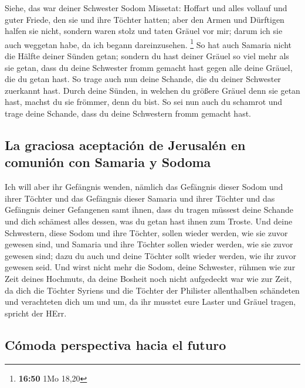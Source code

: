  Siehe, das war deiner Schwester Sodom Missetat: Hoffart
und alles vollauf und guter Friede, den sie und ihre Töchter hatten;
aber den Armen und Dürftigen halfen sie nicht,  sondern
waren stolz und taten Gräuel vor mir; darum ich sie auch weggetan habe,
da ich begann dareinzusehen. \footnote{\textbf{16:50} 1Mo 18,20}
 So hat auch Samaria nicht die Hälfte deiner Sünden
getan; sondern du hast deiner Gräuel so viel mehr als sie getan, dass du
deine Schwester fromm gemacht hast gegen alle deine Gräuel, die du getan
hast.  So trage auch nun deine Schande, die du deiner
Schwester zuerkannt hast. Durch deine Sünden, in welchen du größere
Gräuel denn sie getan hast, machst du sie frömmer, denn du bist. So sei
nun auch du schamrot und trage deine Schande, dass du deine Schwestern
fromm gemacht hast.

\hypertarget{la-graciosa-aceptaciuxf3n-de-jerusaluxe9n-en-comuniuxf3n-con-samaria-y-sodoma}{%
\subsection{La graciosa aceptación de Jerusalén en comunión con Samaria
y
Sodoma}\label{la-graciosa-aceptaciuxf3n-de-jerusaluxe9n-en-comuniuxf3n-con-samaria-y-sodoma}}

 Ich will aber ihr Gefängnis wenden, nämlich das
Gefängnis dieser Sodom und ihrer Töchter und das Gefängnis dieser
Samaria und ihrer Töchter und das Gefängnis deiner Gefangenen samt
ihnen,  dass du tragen müssest deine Schande und dich
schämest alles dessen, was du getan hast ihnen zum Troste.
 Und deine Schwestern, diese Sodom und ihre Töchter,
sollen wieder werden, wie sie zuvor gewesen sind, und Samaria und ihre
Töchter sollen wieder werden, wie sie zuvor gewesen sind; dazu du auch
und deine Töchter sollt wieder werden, wie ihr zuvor gewesen seid.
 Und wirst nicht mehr die Sodom, deine Schwester, rühmen
wie zur Zeit deines Hochmuts,  da deine Bosheit noch
nicht aufgedeckt war wie zur Zeit, da dich die Töchter Syriens und die
Töchter der Philister allenthalben schändeten und verachteten dich um
und um,  da ihr musstet eure Laster und Gräuel tragen,
spricht der HErr.

\hypertarget{cuxf3moda-perspectiva-hacia-el-futuro}{%
\subsection{Cómoda perspectiva hacia el
futuro}\label{cuxf3moda-perspectiva-hacia-el-futuro}}


